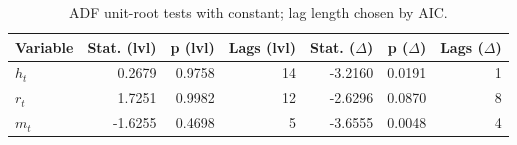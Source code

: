 \begin{table}[H]
\centering
\caption{ADF unit-root tests with constant; lag length chosen by AIC.}
\label{tab:unit_root_tests}
\begin{tabular}{lrrrrrr}
\toprule
Variable & Stat. (lvl) & p (lvl) & Lags (lvl) & Stat. ($\Delta$) & p ($\Delta$) & Lags ($\Delta$) \\
\midrule
$h_t$ & 0.2679 & 0.9758 & 14 & -3.2160 & 0.0191 & 1 \\
$r_t$ & 1.7251 & 0.9982 & 12 & -2.6296 & 0.0870 & 8 \\
$m_t$ & -1.6255 & 0.4698 & 5 & -3.6555 & 0.0048 & 4 \\
\bottomrule
\end{tabular}
\end{table}
